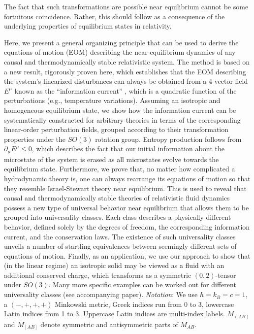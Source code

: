 \documentclass[aps,prl,singlecolumn,nofootinbib]{revtex4-2}
\theoremstyle{definition}
\theoremstyle{theorem}
\begin{document}
The fact that such transformations are possible near equilibrium cannot be some fortuitous coincidence. Rather, this should follow as a consequence of the underlying properties of equilibrium states in relativity.

Here, we present a general organizing principle that can be used to derive the equations of motion (EOM) describing the near-equilibrium dynamics of any causal and thermodynamically stable relativistic system. The method is based on a new result, rigorously proven here, which establishes that the EOM describing the system's linearized disturbances can always be obtained from a 4-vector field $E^\mu$ known as the ``information current'' \cite{GavassinoCausality2021}, which is a quadratic function of the perturbations (e.g., temperature variations). Assuming an isotropic and homogeneous equilibrium state, we show how the information current can be systematically constructed for arbitrary theories in terms of the corresponding linear-order perturbation fields, grouped according to their transformation properties under the $SO(3)$ rotation group. Entropy production follows from $\partial_\mu E^\mu \leq 0$,  which describes the fact that our initial information about the microstate of the system \cite{Jaynes1965} is erased as all microstates evolve towards the equilibrium state. Furthermore, we prove that, no matter how complicated a hydrodynamic theory is, one can always rearrange its equations of motion so that they resemble Israel-Stewart theory \cite{Israel_Stewart_1979} near equilibrium. This is used to reveal that causal and thermodynamically stable theories of relativistic fluid dynamics possess a new type of universal behavior near equilibrium that allows them to be grouped into universality classes. Each class describes a physically different behavior, defined solely by the degrees of freedom, the corresponding information current, and the conservation laws. The existence of such universality classes unveils a number of startling equivalences between seemingly different sets of equations of motion. 
Finally, as an application, we use our approach to show that (in the linear regime) an isotropic solid may be viewed as a fluid with an additional conserved charge, which transforms as a symmetric $(0,2)$-tensor under $SO(3)$.
Many more specific examples can be worked out for different universality classes (see accompanying paper). \emph{Notation}: We use $\hbar=k_B = c=1$, a $(-,+,+,+)$ Minkowski metric, Greek indices run from 0 to 3,  lowercase Latin indices from 1 to 3. Uppercase Latin indices are multi-index labels. $M_{(AB)}$ and $M_{[AB]}$ denote symmetric and antisymmetric parts of $M_{AB}$.
\end{document}
